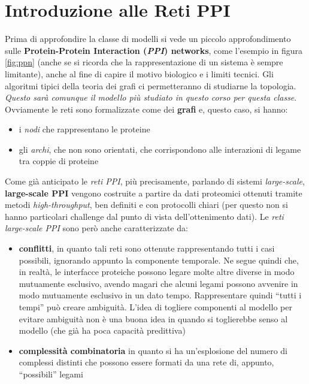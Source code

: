 \documentclass[a4paper,12pt, oneside]{book}
\begin{document}
\section{Introduzione alle Reti PPI}
Prima di approfondire la classe di modelli si vede un piccolo approfondimento
sulle \textbf{Protein-Protein Interaction (\textit{PPI}) networks}, come
l'esempio in figura \ref{fig:ppn} (anche se si ricorda che la rappresentazione
di un sistema è sempre limitante), anche al
fine di capire il motivo biologico e i limiti tecnici. Gli algoritmi tipici
della teoria dei grafi ci permetteranno di studiarne la topologia.\\
\textit{Questo sarà comunque il modello più studiato in questo corso per questa
  classe}.\\ 
Ovviamente le reti sono formalizzate come dei \textbf{grafi} e, questo caso, si
hanno:
\begin{itemize}
  \item i \textit{nodi} che rappresentano le proteine
  \item gli \textit{archi}, che non sono orientati, che corrispondono alle
  interazioni di legame tra coppie di proteine
\end{itemize}
Come già anticipato le \textit{reti PPI}, più precisamente, parlando di sistemi
\textit{large-scale}, \textbf{large-scale PPI} vengono costruite a partire da
dati proteomici ottenuti tramite metodi \textit{high-throughput}, ben definiti e
con protocolli chiari (per questo non si hanno particolari challenge dal punto
di vista dell'ottenimento dati). Le \textit{reti large-scale PPI} sono però
anche caratterizzate da:
\begin{itemize}
  \item \textbf{conflitti}, in quanto tali reti sono ottenute rappresentando
  tutti i casi possibili, ignorando appunto la componente temporale. Ne segue
  quindi che, in realtà, le interfacce proteiche possono legare molte altre 
  diverse in modo mutuamente esclusivo, avendo magari che alcuni legami possono
  avvenire in modo mutuamente esclusivo in un dato tempo. Rappresentare quindi
  ``tutti i tempi'' può creare ambiguità. L'idea di togliere componenti al
  modello per evitare ambiguità non è una buona idea in quando si toglierebbe
  senso al modello (che già ha poca capacità predittiva)
  \item \textbf{complessità combinatoria} in quanto si ha un'esplosione del
  numero di complessi distinti che possono essere formati da una rete di,
  appunto, ``possibili'' legami
\end{itemize}
\end{document}
